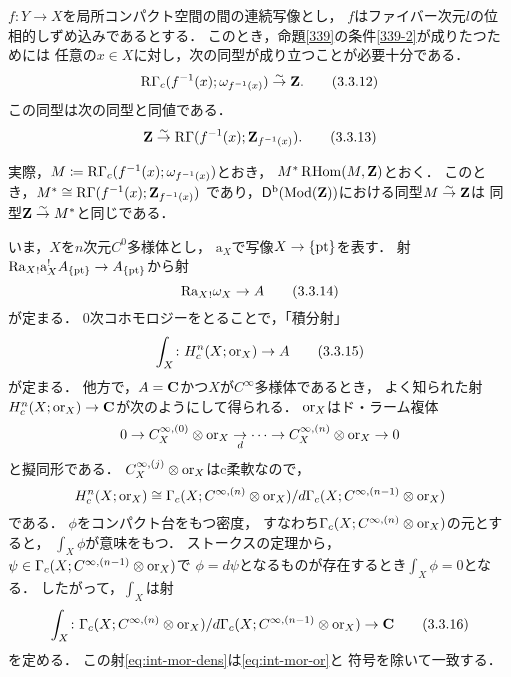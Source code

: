 \begin{RMK}[{\cite[Remark 3.3.10]{KS90}}]\label{3310}
    \(f\colon Y\to X\)を局所コンパクト空間の間の連続写像とし，
    \(f\)はファイバー次元\(l\)の位相的しずめ込みであるとする．
    このとき，命題\ref{339}の条件\eqref{339-2}が成りたつためには
    任意の\(x\in X\)に対し，次の同型が成り立つことが必要十分である．
    \begin{equation}
        \mathop{\mathrm{R}\hspace{-0pt}\Gamma}\nolimits_c(f^{-1}(x);\omega_{f^{-1}(x)})\mathrel{\overset{\sim}{\rightarrow}}\mathbf{Z}.\tag{3.3.12}
    \end{equation}
    この同型は次の同型と同値である．
    \begin{equation}
        \mathbf{Z}\mathrel{\overset{\sim}{\rightarrow}}
        \mathop{\mathrm{R}\hspace{-0pt}\Gamma}\nolimits(f^{-1}(x);\mathbf{Z}_{f^{-1}(x)}).\tag{3.3.13}
    \end{equation}
\end{RMK}
実際，\(M\coloneqq\mathop{\mathrm{R}\hspace{-0pt}\Gamma}\nolimits_c(f^{-1}(x);\omega_{f^{-1}(x)})\)とおき，
\(M^\ast\mathop{\mathrm{R}\hspace{-1.5pt}\mathop{\mathrm{Hom}}\nolimits}\nolimits(M,\mathbf{Z})\)とおく．
このとき，\(M^\ast\cong \mathop{\mathrm{R}\hspace{-0pt}\Gamma}\nolimits(f^{-1}(x);\mathbf{Z}_{f^{-1}(x)})\)
であり，\(\mathop{\mathsf{D}^\mathrm{b}}\nolimits(\mathop{\mathrm{Mod}}\nolimits(\mathbf{Z}))\)における同型\(M\mathrel{\overset{\sim}{\rightarrow}}\mathbf{Z}\)は
同型\(\mathbf{Z}\mathrel{\overset{\sim}{\rightarrow}} M^\ast\)と同じである．

\bigskip

いま，\(X\)を\(n\)次元\(C^0\)多様体とし，
\(\mathrm{a}_X\)で写像\(X\to\{\mathop{\mathrm{pt}}\nolimits\}\)を表す．
射\(
    {\mathrm{R}\mathrm{a}_X}_!\mathrm{a}_X^!A_{\{\mathop{\mathrm{pt}}\nolimits\}}
    \to A_{\{\mathop{\mathrm{pt}}\nolimits\}}
\)から射
\begin{equation}
    {\mathrm{R}\mathrm{a}_X}_!\omega_X\to A\tag{3.3.14}
\end{equation}
が定まる．
\(0\)次コホモロジーをとることで，「積分射」
\begin{equation}\label{eq:int-mor-or}
    \int_X\colon H^n_c(X;\mathord{\mathrm{or}}_X)\to A\tag{3.3.15}
\end{equation}
が定まる．
他方で，\(A=\mathbf{C}\)かつ\(X\)が\(C^\infty\)多様体であるとき，
よく知られた射\(H^n_c(X;\mathord{\mathrm{or}}_X)\to \mathbf{C}\)が次のようにして得られる．
\(\mathord{\mathrm{or}}_X\)はド・ラーム複体
\[
    0\to C_X^{\infty,(0)}\otimes\mathord{\mathrm{or}}_X\underset{d}{\to}
    \cdots
    \to
    C_X^{\infty,(n)}\otimes\mathord{\mathrm{or}}_X
    \to0
\]
と擬同形である．
\(
    C_X^{\infty,(j)}\otimes\mathord{\mathrm{or}}_X
\)はc柔軟なので，
\[
    H^n_c(X;\mathord{\mathrm{or}}_X)
    \cong
    \Gamma_c(X;C^{\infty,(n)}\otimes\mathord{\mathrm{or}}_X)/d\Gamma_c(X;C^{\infty,(n-1)}\otimes\mathord{\mathrm{or}}_X)
\]である．
\(\phi\)をコンパクト台をもつ密度，
すなわち\(\Gamma_c(X;C^{\infty,(n)}\otimes\mathord{\mathrm{or}}_X)\)の元とすると，
\(\int_X\phi\)が意味をもつ．
ストークスの定理から，
\(\psi\in\Gamma_c(X;C^{\infty,(n-1)}\otimes\mathord{\mathrm{or}}_X)\)で
\(\phi=d\psi\)となるものが存在するとき\(\int_X\phi=0\)となる．
したがって，\(\int_X\)は射
\begin{equation}\label{eq:int-mor-dens}
    \int_X\colon
    \Gamma_c(X;C^{\infty,(n)}\otimes\mathord{\mathrm{or}}_X)/d\Gamma_c(X;C^{\infty,(n-1)}\otimes\mathord{\mathrm{or}}_X)
    \to\mathbf{C}\tag{3.3.16}
\end{equation}
を定める．
この射\eqref{eq:int-mor-dens}は\eqref{eq:int-mor-or}と
符号を除いて一致する．

